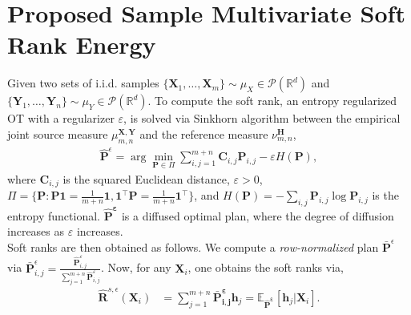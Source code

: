 \documentclass{article}
\begin{document}
\section{Proposed Sample Multivariate Soft Rank Energy}
\label{sec:proposed}
Given two sets of i.i.d. samples {\small $\{\bm X_1, \dots,\bm X_m \}\!\!\sim\!\! \mu_{X}\in \mathcal P(\mathbb R^d)$} and {\small $\{\bm Y_1, \dots,\bm Y_n\} \!\!\sim\!\! \mu_{Y}\in \mathcal P(\mathbb R^d)$}. To compute the soft rank, an entropy regularized OT  with a regularizer $\varepsilon$, is solved via Sinkhorn algorithm \cite{peyre2019computational} between the empirical joint source measure $\mu_{m, n}^{\bm X, \bm Y}$ and the reference measure $\nu_{m,n}^{\mathbf H}$, 
{\small  
  \setlength{\abovedisplayskip}{3pt}
  \setlength{\belowdisplayskip}{\abovedisplayskip}
  \setlength{\abovedisplayshortskip}{0pt}
  \setlength{\belowdisplayshortskip}{3pt}
\begin{align}
\label{empirical_sink}
    \mathbf{\widehat P}^\epsilon = \arg \min_{\mathbf{P} \in \Pi} \sum_{i,j = 1}^{m+n} \mathbf{C}_{i,j} \mathbf{P}_{i,j} - \varepsilon H(\mathbf{P}),
\end{align}
}%
where {\small$\mathbf{C}_{i,j}$} is the squared Euclidean distance, {\small $\varepsilon > 0$,  $\Pi = \{ \mathbf{P}: \mathbf{P} \bm{1} = \frac{1}{m+n} \bm{1}, \bm{1}^\top \mathbf{P} = \frac{1}{m+n} \bm{1}^\top\}$}, and {\small $H(\mathbf{P}) = - \sum_{i,j} \mathbf{P}_{i,j} \log \mathbf{P}_{i,j}$} is the entropy functional. $\mathbf {\widehat P^\varepsilon}$ is a diffused optimal plan, where the degree of diffusion increases as $\varepsilon$ increases. \\
Soft ranks are then obtained as follows. We compute a  \emph{row-normalized} plan $\mathbf{\bar P}^{\epsilon}$ via $\mathbf{\bar P}_{i,j}^\epsilon = \frac{\mathbf{\widehat P}_{i,j}^\varepsilon}{\sum_{j=1}^{m+n} \mathbf{\widehat P}_{i,j}^\varepsilon}$. Now, for any $\bm X_i$, one obtains the soft ranks via,
{\small  
  \setlength{\abovedisplayskip}{1pt}
  \setlength{\belowdisplayskip}{\abovedisplayskip}
  \setlength{\abovedisplayshortskip}{0pt}
  \setlength{\belowdisplayshortskip}{3pt}
\begin{align}\label{softrank}
    \widehat{\mathbf{R}}^{s,\epsilon} (\bm{X}_i) &= \sum_{j=1}^{m+n} \mathbf {\bar P^\varepsilon_{i, j}} \bm h_j = \mathbb E_{\mathbf {\widehat P^\varepsilon}}[\bm h_j|\bm X_i].
\end{align}
}%
\end{document}
